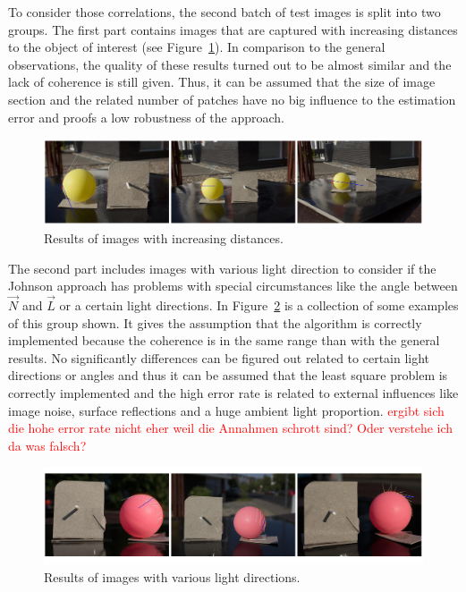 To consider those correlations, the second batch of test images is split into two groups. The first part contains images that are captured with increasing distances to the object of interest (see Figure~\ref{fig:difDistance}). In comparison to the general observations, the quality of these results turned out to be almost similar and the lack of coherence is still given. Thus, it can be assumed that the size of image section and the related number of patches have no big influence to the estimation error and proofs a low robustness of the approach. 
\begin{figure}[H] 

	\center 
	\includegraphics[width=\linewidth]{Images/versch_Anstaende.jpg}
	\caption[Bildunterschrift]{Results of images with increasing distances.}
		\label{fig:difDistance}		
\end{figure}
The second part includes images with various light direction to consider if the Johnson approach has problems with special circumstances like the angle between $\vec{N}$ and $\vec{L}$ or a certain light directions. In Figure~\ref{fig:divLightDirect} is a collection of some examples of this group shown. It gives the assumption that the algorithm is correctly implemented because the coherence is in the same range than with the general results. No significantly differences can be figured out related to certain light directions or angles and thus it can be assumed that the least square problem is correctly implemented and the high error rate is related to external influences like image noise, surface reflections and a huge ambient light proportion. \textcolor{red}{ergibt sich die hohe error rate nicht eher weil die Annahmen schrott sind? Oder verstehe ich da was falsch?}
\begin{figure}[H] 

	\center 
	\includegraphics[width=\linewidth]{Images/versch_Lichtrichtungen.jpg}
	\caption[Bildunterschrift]{Results of images with various light directions.}
		\label{fig:divLightDirect}		
\end{figure}

